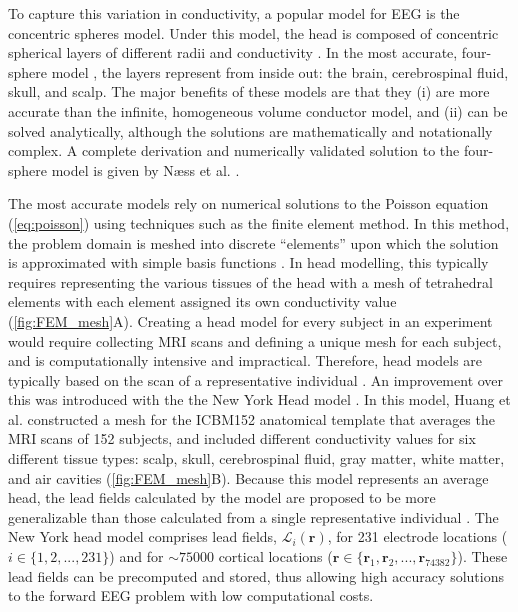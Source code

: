 To capture this variation in conductivity, a popular model for EEG is the concentric spheres model. Under this model, the head is composed of concentric spherical layers of different radii and conductivity \cite{Geisler1961}. In the most accurate, four-sphere model \cite{Hosek1978}, the layers represent from inside out: the brain, cerebrospinal fluid, skull, and scalp. The major benefits of these models are that they (i) are more accurate than the infinite, homogeneous volume conductor model, and (ii) can be solved analytically, although the solutions are mathematically and notationally complex. A complete derivation and numerically validated solution to the four-sphere model is given by Næss et al. \cite{Næss2017}.

The most accurate models rely on numerical solutions to the Poisson equation (\ref{eq:poisson}) using techniques such as the finite element method. In this method, the problem domain is meshed into discrete ``elements'' upon which the solution is approximated with simple basis functions \cite{Liu2014}. In head modelling, this typically requires representing the various tissues of the head with a mesh of tetrahedral elements with each element assigned its own conductivity value \cite{Hallez2007} (\autoref{fig:FEM_mesh}{A}). Creating a head model for every subject in an experiment would require collecting MRI scans and defining a unique mesh for each subject, and is computationally intensive and impractical. Therefore, head models are typically based on the scan of a representative individual \cite{Holmes1998}. An improvement over this was introduced with the the New York Head model \cite{Huang2016}. In this model, Huang et al. \cite{Huang2016} constructed a mesh for the ICBM152 anatomical template that averages the MRI scans of 152 subjects, and included different conductivity values for six different tissue types: scalp, skull, cerebrospinal fluid, gray matter, white matter, and air cavities (\autoref{fig:FEM_mesh}B). Because this model represents an average head, the lead fields calculated by the model are proposed to be more generalizable than those calculated from a single representative individual \cite{Huang2016}. The New York head model comprises lead fields, $\mathcal{L}_i(\bm{r})$, for 231 electrode locations ($i\in\{1,2,...,231\}$) and for  ${\sim}75000$ cortical locations ($\bm{r}\in\{ \bm{r}_1, \bm{r}_2, ..., \bm{r}_{74382} \}$). These lead fields can be precomputed and stored, thus allowing high accuracy solutions to the forward EEG problem with low computational costs.

